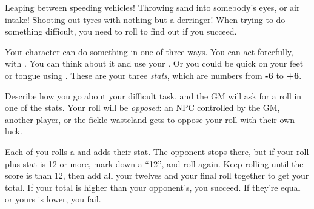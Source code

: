 
Leaping between speeding vehicles! Throwing sand into somebody's eyes, or air intake! Shooting out tyres with nothing but a derringer! When trying to do something difficult, you need to roll to find out if you succeed.

Your character can do something in one of three ways. You can act forcefully, with . You can think about it and use your . Or you could be quick on your feet or tongue using . These are your three \emph{stats}, which are numbers from \textbf{-6} to \textbf{+6}.

Describe how you go about your difficult task, and the GM will ask for a roll in one of the stats. Your roll will be \emph{opposed}: an NPC controlled by the GM, another player, or the fickle wasteland gets to oppose your roll with their own luck.

Each of you rolls a  and adds their stat. The opponent stops there, but if your roll plus stat is 12 or more, mark down a ``12'', and roll again. Keep rolling until the score is than 12, then add all your twelves and your final roll together to get your total. If your total is higher than your opponent's, you succeed. If they're equal or yours is lower, you fail.
